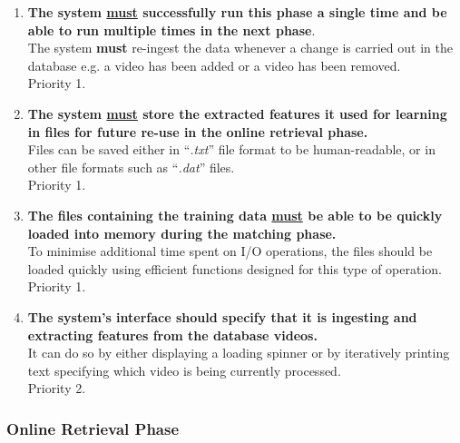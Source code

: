 \begin{enumerate}

    \item \textbf{The system \underline{must} successfully run this phase a single time and be able to run multiple times in the next phase}.\\
    The system \textbf{must} re-ingest the data whenever a change is carried out in the database e.g. a video has been added or a video has been removed.\\
    Priority 1.
    
    \item \textbf{The system \underline{must} store the extracted features it used for learning in files for future re-use in the online retrieval phase.}\\
    Files can be saved either in ``\textit{.txt}'' file format to be human-readable, or in other file formats such as ``\textit{.dat}'' files.\\
    Priority 1.
    
    \item \textbf{The files containing the training data \underline{must} be able to be quickly loaded into memory during the matching phase.}\\
    To minimise additional time spent on I/O operations, the files should be loaded quickly using efficient functions designed for this type of operation.\\
    Priority 1.
    
    
    \item \textbf{The system's interface \underline{}{should} specify that it is ingesting and extracting features from the database videos.}\\
    It can do so by either displaying a loading spinner or by iteratively printing text specifying which video is being currently processed.\\
    Priority 2.
    
\end{enumerate}

\subsubsection{Online Retrieval Phase}

